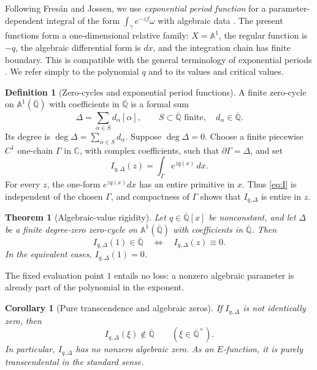 \documentclass[11pt]{article}
\numberwithin{equation}{section}
\newtheorem{theorem}{Theorem}[section]
\newtheorem{corollary}[corollary]{Corollary}
\theoremstyle{definition}
\newtheorem{definition}[definition]{Definition}
\theoremstyle{remark}
\newcommand{\C}{\mathbb C}
\newcommand{\Qbar}{\overline{\mathbb Q}}
\newcommand{\Aone}{\mathbb A^1}
\begin{document}
Following Fres\'an and Jossen, we use \emph{exponential period function} for
a parameter-dependent integral of the form $\int_\gamma e^{-zf}\omega$ with
algebraic data \cite{FresanJossen}.  The present functions form a
one-dimensional relative family: $X=\Aone$, the regular function is $-q$,
the algebraic differential form is $dx$, and the integration chain has finite
boundary.  This is compatible with the general terminology of exponential
periods \cite{CommelinHabeggerHuber}.  We refer simply to the polynomial $q$
and to its values and critical values.

\begin{definition}[Zero-cycles and exponential period functions]
A finite zero-cycle on $\Aone(\Qbar)$ with coefficients in $\Qbar$ is a
formal sum
\[
  \Delta=\sum_{\alpha\in S}d_\alpha[\alpha],
  \qquad
  S\subset\Qbar\text{ finite},\quad d_\alpha\in\Qbar.
\]
Its degree is $\deg\Delta=\sum_{\alpha\in S}d_\alpha$.  Suppose
$\deg\Delta=0$.  Choose a finite piecewise $C^1$ one-chain $\Gamma$ in
$\C$, with complex coefficients, such that $\partial\Gamma=\Delta$, and set
\begin{equation}\label{eq:I}
  I_{q,\Delta}(z)=\int_\Gamma e^{zq(x)}\,dx.
\end{equation}
For every $z$, the one-form $e^{zq(x)}dx$ has an entire primitive in $x$.
Thus \eqref{eq:I} is independent of the chosen $\Gamma$, and compactness of
$\Gamma$ shows that $I_{q,\Delta}$ is entire in $z$.
\end{definition}

\begin{theorem}[Algebraic-value rigidity]\label{thm:rigidity}
Let $q\in\Qbar[x]$ be nonconstant, and let $\Delta$ be a finite degree-zero
zero-cycle on $\Aone(\Qbar)$ with coefficients in $\Qbar$.  Then
\begin{equation}\label{eq:rigidity}
  I_{q,\Delta}(1)\in\Qbar
  \quad\Longleftrightarrow\quad
  I_{q,\Delta}(z)\equiv0.
\end{equation}
In the equivalent cases, $I_{q,\Delta}(1)=0$.
\end{theorem}

The fixed evaluation point $1$ entails no loss: a nonzero algebraic
parameter is already part of the polynomial in the exponent.

\begin{corollary}[Pure transcendence and algebraic zeros]
\label{cor:purely-transcendental}
If $I_{q,\Delta}$ is not identically zero, then
\[
  I_{q,\Delta}(\xi)\notin\Qbar
  \qquad(\xi\in\Qbar^\times).
\]
In particular, $I_{q,\Delta}$ has no nonzero algebraic zero.  As an
$E$-function, it is purely transcendental in the standard sense.
\end{corollary}
\end{document}

